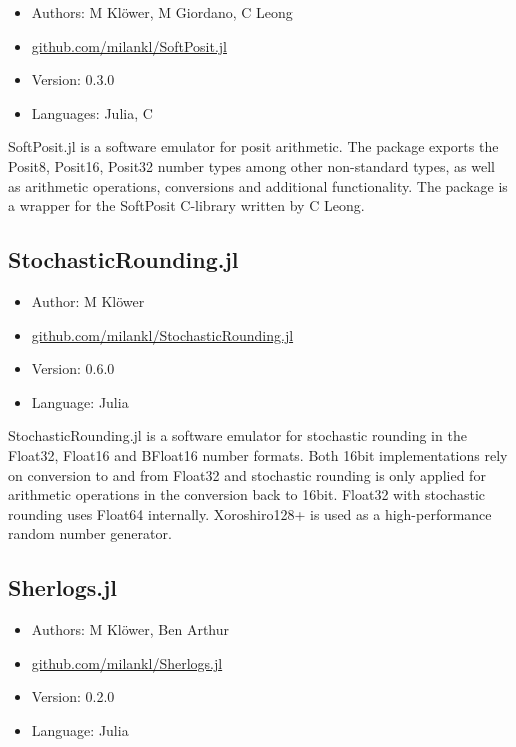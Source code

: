 \begin{itemize}
    \setlength\itemsep{-5pt}
    \item Authors: M Klöwer, M Giordano, C Leong
    \item \href{https://github.com/milankl/SoftPosit.jl}{github.com/milankl/SoftPosit.jl}
    \item Version: 0.3.0
    \item Languages: Julia, C
\end{itemize}

SoftPosit.jl is a software emulator for posit arithmetic. The package exports the Posit8, Posit16, Posit32 number types among other non-standard types,
as well as arithmetic operations, conversions and additional functionality. The package is a wrapper for the SoftPosit C-library written by C Leong.

\subsection{StochasticRounding.jl}

\begin{itemize}
    \setlength\itemsep{-5pt}
    \item Author: M Klöwer
    \item \href{https://github.com/milankl/StochasticRounding.jl}{github.com/milankl/StochasticRounding.jl}
    \item Version: 0.6.0
    \item Language: Julia
\end{itemize}

StochasticRounding.jl is a software emulator for stochastic rounding in the Float32, Float16 and BFloat16 number formats. Both 16bit implementations
rely on conversion to and from Float32 and stochastic rounding is only applied for arithmetic operations in the conversion back to 16bit. Float32 with
stochastic rounding uses Float64 internally. Xoroshiro128+ is used as a high-performance random number generator.

\subsection{Sherlogs.jl}

\begin{itemize}
    \setlength\itemsep{-5pt}
    \item Authors: M Klöwer, Ben Arthur
    \item \href{https://github.com/milankl/Sherlogs.jl}{github.com/milankl/Sherlogs.jl}
    \item Version: 0.2.0
    \item Language: Julia
\end{itemize}

